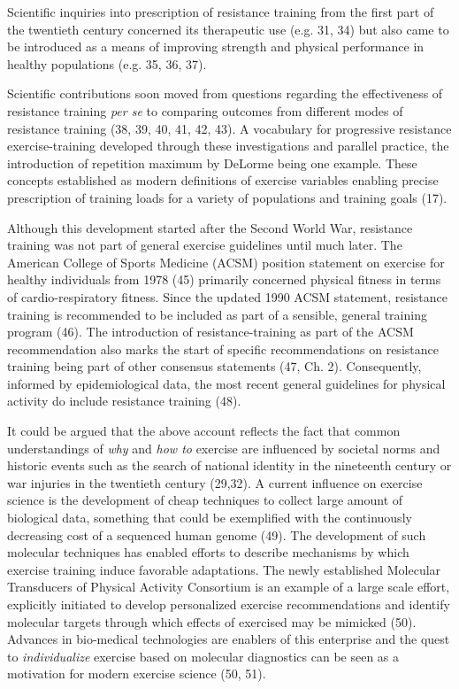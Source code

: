 \documentclass[twoside,10pt]{gihclass} %
\begin{document}
Scientific inquiries into prescription of resistance training from the first part of the twentieth century concerned its therapeutic use
(e.g. 31, 34)
but also came to be introduced as a means of improving strength and physical performance in healthy populations
(e.g. 35, 36, 37).

Scientific contributions soon moved from questions regarding the effectiveness of resistance training \emph{per se} to comparing outcomes from different modes of resistance training
(38, 39, 40, 41, 42, 43).
A vocabulary for progressive resistance exercise-training developed through these investigations and parallel practice,
the introduction of repetition maximum by DeLorme being one example. These concepts established as modern definitions of exercise variables enabling precise prescription of training loads for a variety of populations and training goals
(17).

Although this development started after the Second World War, resistance training was not part of general exercise guidelines until much later.
The American College of Sports Medicine (ACSM) position statement on exercise for healthy individuals from 1978 (45)
primarily concerned physical fitness in terms of cardio-respiratory fitness.
Since the updated 1990 ACSM statement, resistance training is recommended to be included as part of a sensible, general training program (46).
The introduction of resistance-training as part of the ACSM recommendation also marks the start of specific recommendations on resistance training being part of other consensus statements
(47, Ch. 2).
Consequently, informed by epidemiological data, the most recent general guidelines for physical activity do include resistance training (48).

It could be argued that the above account reflects the fact that common understandings of \emph{why} and \emph{how to} exercise are influenced by societal norms and historic events such as the search of national identity in the nineteenth century or war injuries in the twentieth century
(29,32).
A current influence on exercise science is the development of cheap techniques to collect large amount of biological data, something that could be exemplified with the continuously decreasing cost of a sequenced human genome
(49).
The development of such molecular techniques has enabled efforts to describe mechanisms by which exercise training induce favorable adaptations. The newly established Molecular Transducers of Physical Activity Consortium is an example of a large scale effort, explicitly initiated to develop personalized exercise recommendations and identify molecular targets through which effects of exercised may be mimicked (50).
Advances in bio-medical technologies are enablers of this enterprise and the quest to \emph{individualize} exercise based on molecular diagnostics can be seen as a motivation for modern exercise science
(50, 51).
\end{document}
